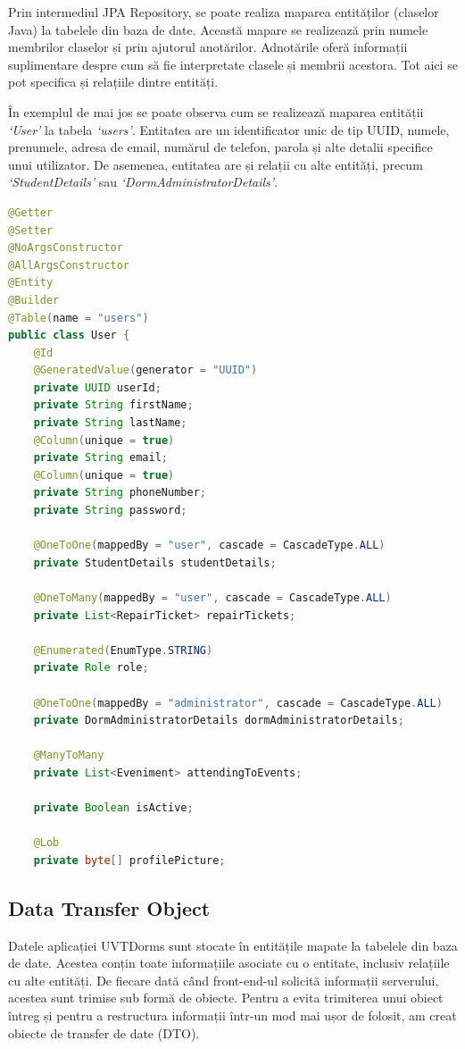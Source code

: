\documentclass[12pt,a4paper]{report}
\theoremstyle{definition}
\theoremstyle{remark}
\begin{document}
\par Prin intermediul JPA Repository, se poate realiza maparea entităților (claselor Java) la tabelele din baza de date. Această mapare se realizează prin numele membrilor claselor și prin ajutorul anotărilor. Adnotările oferă informații suplimentare despre cum să fie interpretate clasele și membrii acestora. Tot aici se pot specifica și relațiile dintre entități.

\par În exemplul de mai jos se poate observa cum se realizează maparea entității \textit{`User'} la tabela \textit{`users'}. Entitatea are un identificator unic de tip UUID, numele, prenumele, adresa de email, numărul de telefon, parola și alte detalii specifice unui utilizator. De asemenea, entitatea are și relații cu alte entități, precum \textit{`StudentDetails'} sau \textit{`DormAdministratorDetails'}.

\begin{lstlisting}[language=Java, caption={Clasa User}]
@Getter
@Setter
@NoArgsConstructor
@AllArgsConstructor
@Entity
@Builder
@Table(name = "users")
public class User {
    @Id
    @GeneratedValue(generator = "UUID")
    private UUID userId;
    private String firstName;
    private String lastName;
    @Column(unique = true)
    private String email;
    @Column(unique = true)
    private String phoneNumber;
    private String password;

    @OneToOne(mappedBy = "user", cascade = CascadeType.ALL)
    private StudentDetails studentDetails;

    @OneToMany(mappedBy = "user", cascade = CascadeType.ALL)
    private List<RepairTicket> repairTickets;

    @Enumerated(EnumType.STRING)
    private Role role;

    @OneToOne(mappedBy = "administrator", cascade = CascadeType.ALL)
    private DormAdministratorDetails dormAdministratorDetails;

    @ManyToMany
    private List<Eveniment> attendingToEvents;

    private Boolean isActive;

    @Lob
    private byte[] profilePicture;
\end{lstlisting}

\subsection{Data Transfer Object}

\par Datele aplicației UVTDorms sunt stocate în entitățile mapate la tabelele din baza de date. Acestea conțin toate informațiile asociate cu o entitate, inclusiv relațiile cu alte entități. De fiecare dată când front-end-ul solicită informații serverului, acestea sunt trimise sub formă de obiecte. Pentru a evita trimiterea unui obiect întreg și pentru a restructura informații într-un mod mai ușor de folosit, am creat obiecte de transfer de date (DTO)\cite{pantaleev2007identifying}.
\end{document}
